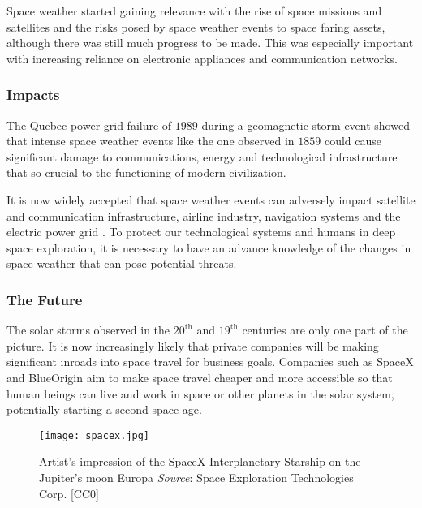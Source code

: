 Space weather started gaining relevance with the rise of space missions and satellites and the 
risks posed by space weather events to space faring assets, although there was still much progress 
to be made. This was especially important with increasing reliance on electronic appliances and 
communication networks.

\subsubsection*{Impacts}

The Quebec power grid failure of $1989$ \citep{kappenman1997geomagnetic} during a geomagnetic storm 
event showed that intense space weather events like the one observed in $1859$ could cause 
significant damage to communications, energy and technological infrastructure that so crucial to 
the functioning of modern civilization.

It is now widely accepted that space weather events can adversely impact satellite and 
communication infrastructure, airline industry, navigation systems and the electric power grid 
\citep{board2009severe,cannon2013extreme,bothmer2007space,baker2004effects}. To protect our 
technological systems and humans in deep space exploration, it is necessary to have an advance 
knowledge of the changes in space weather that can pose potential threats.

\subsubsection*{The Future}

The solar storms observed in the $20^{\text{th}}$ and $19^{\text{th}}$ centuries are only one 
part of the picture. It is now increasingly likely that private companies will be making 
significant inroads into space travel for business goals. Companies such as SpaceX and BlueOrigin 
aim to make space travel cheaper and more accessible so that human beings can live and work in 
space or other planets in the solar system, potentially starting a second space age.


\begin{wrapfigure}{l}{0.4\textwidth}
    \centering\texttt{[image: spacex.jpg]}
    \caption{
        {\small
            Artist's impression of the SpaceX Interplanetary Starship on the Jupiter's moon Europa 
            \textit{Source}: Space Exploration Technologies Corp. [CC0]
        } 
    }
    \label{fig:spacex}
\end{wrapfigure}

